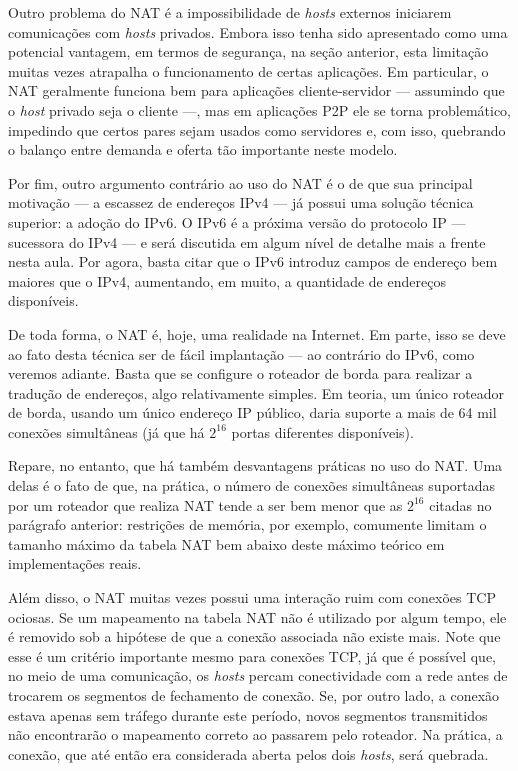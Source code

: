\documentclass{article}
\begin{document}
Outro problema do NAT é a impossibilidade de \textit{hosts} externos iniciarem comunicações com \textit{hosts} privados. Embora isso tenha sido apresentado como uma potencial vantagem, em termos de segurança, na seção anterior, esta limitação muitas vezes atrapalha o funcionamento de certas aplicações. Em particular, o NAT geralmente funciona bem para aplicações cliente-servidor --- assumindo que o \textit{host} privado seja o cliente ---, mas em aplicações P2P ele se torna problemático, impedindo que certos pares sejam usados como servidores e, com isso, quebrando o balanço entre demanda e oferta tão importante neste modelo.

Por fim, outro argumento contrário ao uso do NAT é o de que sua principal motivação --- a escassez de endereços IPv4 --- já possui uma solução técnica superior: a adoção do IPv6. O IPv6 é a próxima versão do protocolo IP --- sucessora do IPv4 --- e será discutida em algum nível de detalhe mais a frente nesta aula. Por agora, basta citar que o IPv6 introduz campos de endereço bem maiores que o IPv4, aumentando, em muito, a quantidade de endereços disponíveis.

De toda forma, o NAT é, hoje, uma realidade na Internet. Em parte, isso se deve ao fato desta técnica ser de fácil implantação --- ao contrário do IPv6, como veremos adiante. Basta que se configure o roteador de borda para realizar a tradução de endereços, algo relativamente simples. Em teoria, um único roteador de borda, usando um único endereço IP público, daria suporte a mais de 64 mil conexões simultâneas (já que há $2^{16}$ portas diferentes disponíveis).

Repare, no entanto, que há também desvantagens práticas no uso do NAT. Uma delas é o fato de que, na prática, o número de conexões simultâneas suportadas por um roteador que realiza NAT tende a ser bem menor que as $2^{16}$ citadas no parágrafo anterior: restrições de memória, por exemplo, comumente limitam o tamanho máximo da tabela NAT bem abaixo deste máximo teórico em implementações reais. 

Além disso, o NAT muitas vezes possui uma interação ruim com conexões TCP ociosas. Se um mapeamento na tabela NAT não é utilizado por algum tempo, ele é removido sob a hipótese de que a conexão associada não existe mais. Note que esse é um critério importante mesmo para conexões TCP, já que é possível que, no meio de uma comunicação, os \textit{hosts} percam conectividade com a rede antes de trocarem os segmentos de fechamento de conexão. Se, por outro lado, a conexão estava apenas sem tráfego durante este período, novos segmentos transmitidos não encontrarão o mapeamento correto ao passarem pelo roteador. Na prática, a conexão, que até então era considerada aberta pelos dois \textit{hosts}, será quebrada.
\end{document}
